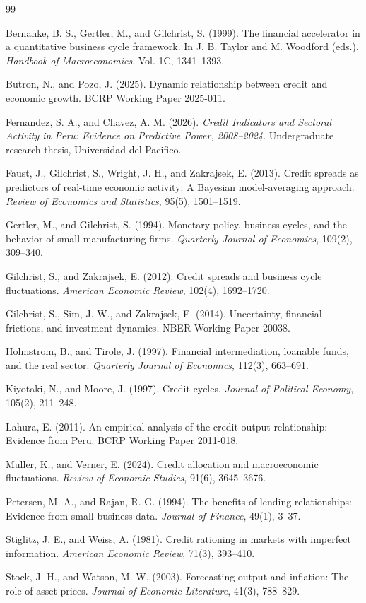 \documentclass[11pt]{article}
\theoremstyle{definition}
\theoremstyle{remark}
\begin{document}
\begin{thebibliography}{99}

Bernanke, B. S., Gertler, M., and Gilchrist, S. (1999).
The financial accelerator in a quantitative business cycle framework.
In J. B. Taylor and M. Woodford (eds.), \emph{Handbook of Macroeconomics},
Vol. 1C, 1341--1393.

Butron, N., and Pozo, J. (2025).
Dynamic relationship between credit and economic growth.
BCRP Working Paper 2025-011.

Fernandez, S. A., and Chavez, A. M. (2026).
\emph{Credit Indicators and Sectoral Activity in Peru: Evidence on Predictive
Power, 2008--2024}. Undergraduate research thesis, Universidad del Pacifico.

Faust, J., Gilchrist, S., Wright, J. H., and Zakrajsek, E. (2013).
Credit spreads as predictors of real-time economic activity: A Bayesian
model-averaging approach. \emph{Review of Economics and Statistics},
95(5), 1501--1519.

Gertler, M., and Gilchrist, S. (1994).
Monetary policy, business cycles, and the behavior of small manufacturing
firms. \emph{Quarterly Journal of Economics}, 109(2), 309--340.

Gilchrist, S., and Zakrajsek, E. (2012).
Credit spreads and business cycle fluctuations.
\emph{American Economic Review}, 102(4), 1692--1720.

Gilchrist, S., Sim, J. W., and Zakrajsek, E. (2014).
Uncertainty, financial frictions, and investment dynamics.
NBER Working Paper 20038.

Holmstrom, B., and Tirole, J. (1997).
Financial intermediation, loanable funds, and the real sector.
\emph{Quarterly Journal of Economics}, 112(3), 663--691.

Kiyotaki, N., and Moore, J. (1997).
Credit cycles. \emph{Journal of Political Economy}, 105(2), 211--248.

Lahura, E. (2011).
An empirical analysis of the credit-output relationship: Evidence from Peru.
BCRP Working Paper 2011-018.

Muller, K., and Verner, E. (2024).
Credit allocation and macroeconomic fluctuations.
\emph{Review of Economic Studies}, 91(6), 3645--3676.

Petersen, M. A., and Rajan, R. G. (1994).
The benefits of lending relationships: Evidence from small business data.
\emph{Journal of Finance}, 49(1), 3--37.

Stiglitz, J. E., and Weiss, A. (1981).
Credit rationing in markets with imperfect information.
\emph{American Economic Review}, 71(3), 393--410.

Stock, J. H., and Watson, M. W. (2003).
Forecasting output and inflation: The role of asset prices.
\emph{Journal of Economic Literature}, 41(3), 788--829.

\end{thebibliography}
\end{document}
